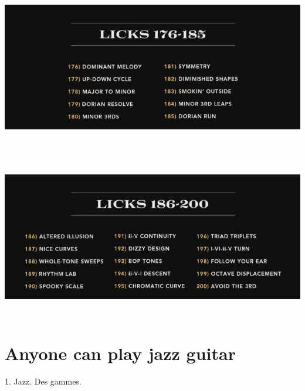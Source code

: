 \documentclass[a4paper]{book}
\begin{document}
\clearpage

\begin{center}
\includegraphics[width=17cm,height=7.177cm]{lebluessupportsmethodes-img43.jpg}
\end{center}


\begin{center}
\includegraphics[width=17cm,height=7.177cm]{lebluessupportsmethodes-img44.jpg}
\end{center}
\clearpage\section[Anyone can play jazz guitar]{Anyone can play jazz
guitar}
\hypertarget{RefHeadingToc110973218262}{}1. Jazz. Des gammes.
\end{document}
